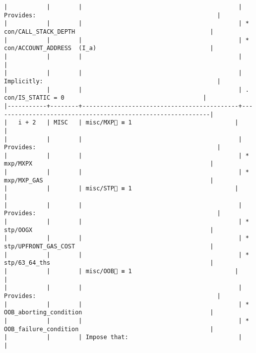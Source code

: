 \documentclass[varwidth=\maxdimen,margin=0.5cm,multi={verbatim}]{standalone}
\begin{document}
\begin{verbatim}
|           |        |                                            | Provides:                                                   |
|           |        |                                            | * con/CALL_STACK_DEPTH                                      |
|           |        |                                            | * con/ACCOUNT_ADDRESS  (I_a)                                |
|           |        |                                            |                                                             |
|           |        |                                            | Implicitly:                                                 |
|           |        |                                            | .   con/IS_STATIC = 0                                       |
|-----------+--------+--------------------------------------------+-------------------------------------------------------------|
|   i + 2   | MISC   | misc/MXP🚩 ≡ 1                             |                                                             |
|           |        |                                            | Provides:                                                   |
|           |        |                                            | * mxp/MXPX                                                  |
|           |        |                                            | * mxp/MXP_GAS                                               |
|           |        | misc/STP🚩 ≡ 1                             |                                                             |
|           |        |                                            | Provides:                                                   |
|           |        |                                            | * stp/OOGX                                                  |
|           |        |                                            | * stp/UPFRONT_GAS_COST                                      |
|           |        |                                            | * stp/63_64_ths                                             |
|           |        | misc/OOB🚩 ≡ 1                             |                                                             |
|           |        |                                            | Provides:                                                   |
|           |        |                                            | * OOB_aborting_condition                                    |
|           |        |                                            | * OOB_failure_condition                                     |
|           |        | Impose that:                               |                                                             |

\end{verbatim}
\end{document}
